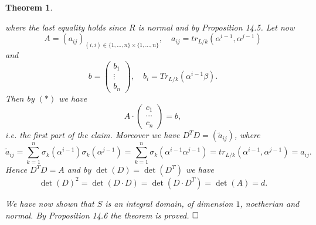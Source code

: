 \documentclass[11pt]{book}
\newtheorem{theorem}{Theorem}[section]
\theoremstyle{nonumberbreak}
\newenvironment{pr}[1][]{\ifthenelse{\equal{#1}{}}{\proof}{\proof[#1]}\rm}{\endproof}
\begin{document}
\begin{spacing}{1.3}
\begin{theorem}
\begin{pr}
\begin{compactenum}
where the last equality holds since $R$ is normal and by Proposition 14.5. Let now 
$$A=\left(a_{ij}\right)_{(i,i) \in \{1,\ldots, n\} \times \{1, \ldots, n \}}, \quad a_{ij}=tr_{L/k}(\alpha^{i-1}, \alpha^{j-1})$$
and
$$b=\begin{pmatrix} b_1 \\ \vdots \\ b_n \end{pmatrix}, \quad b_i=Tr_{L/k}(\alpha^{i-1}\beta).$$
Then by $(*)$ we have
$$A \cdot \begin{pmatrix} c_1 \\ \cdots \\ c_n \end{pmatrix} = b,$$
i.e. the first part of the claim. Moreover we have
$D^TD=\left(\tilde{a}_{ij}\right)$, where
$$\tilde{a}_{ij}=\sum_{k=1}^n \sigma_k(\alpha^{i-1}) \sigma_k(\alpha^{j-1})=\sum_{k=1}^n \sigma_k(\alpha^{i-1}\alpha^{j-1})=tr_{L/k}(\alpha^{i-1}, \alpha^{j-1}) = a_{ij}.$$
Hence $D^TD=A$ and by $\det(D)=\det(D^T)$ we have $$\det(D)^2=\det(D\cdot D)=\det(D \cdot D^T)=\det(A)=d.$$
\end{compactenum}
We have now shown that $S$ is an integral domain, of dimension $1$, noetherian and normal. By Proposition 14.6 the theorem is proved. $\hfill \Box$
\end{pr}
\end{theorem}

\end{spacing}
\end{document}
